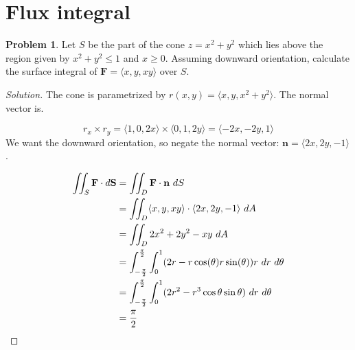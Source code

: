 \documentclass[12pt]{amsart}%
\theoremstyle{plain}
\theoremstyle{definition}
\newtheorem{prob}[theorem]{Problem}
\theoremstyle{special}
\newcommand{\sol}[1]{
{\begin{proof}[Solution]#1\end{proof}}
}
\newcommand{\Prob}[1]{\begin{tcolorbox}%
\begin{prob}
	#1
\end{prob}
\end{tcolorbox}	
}
\begin{document}
\section{Flux integral}
\Prob{Let $S$ be the part of the cone $z=x^2+y^2$ which lies above the region given by $x^2+y^2\leq 1$ and $x\geq 0$. Assuming downward orientation, calculate the surface integral of $\mathbf{ F}=\langle x,y,xy\rangle$ over $S$.}
\sol{The cone is parametrized by $r(x,y)=\langle x,y,x^2+y^2\rangle$.
		The normal vector is.
		
		\[r_x \times r_y = \langle 1,0,2x\rangle\times \langle 0,1,2y\rangle = \langle -2x,-2y,1\rangle\]
		We want the downward orientation, so negate the normal vector:
		$\mathbf n=\langle 2x,2y,-1\rangle$.
		
		\begin{align*}
		\iint_S \mathbf{F}\cdot d\mathbf{S} &= \iint_D \mathbf{F}\cdot \mathbf n\ dS\\
		&=\iint_D\langle x,y,xy\rangle \cdot \langle 2x,2y,-1\rangle \ dA
		\\
		&=\iint_D2x^2+2y^2-xy\ dA\\
		&=\int_{-{\pi\over 2}}^{\pi\over 2}\int_0^1 (2r-r\cos(\theta)r\sin(\theta))r\ dr\ d\theta\\
		&=\int_{-{\pi\over 2}}^{\pi\over 2}\int_0^1 (2r^2-r^3\cos\theta\sin\theta )\ dr\ d\theta\\
		&={\pi\over 2}\qedhere
		\end{align*}}
		
\end{document}
